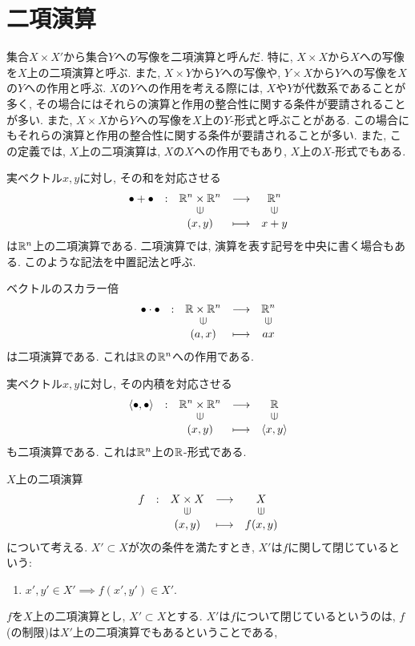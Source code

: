 \section{二項演算}
集合$X\times X'$から集合$Y$への写像を二項演算と呼んだ.
特に, $X\times X$から$X$への写像を$X$上の二項演算と呼ぶ.
また, $X\times Y$から$Y$への写像や,
 $Y\times X$から$Y$への写像を$X$の$Y$への作用と呼ぶ.
$X$の$Y$への作用を考える際には,
$X$や$Y$が代数系であることが多く,
その場合にはそれらの演算と作用の整合性に関する条件が要請されることが多い.
また, $X\times X$から$Y$への写像を$X$上の$Y$-形式と呼ぶことがある.
この場合にもそれらの演算と作用の整合性に関する条件が要請されることが多い.
また, この定義では, $X$上の二項演算は, $X$の$X$への作用でもあり,
$X$上の$X$-形式でもある.

\begin{example}
  実ベクトル$x,y$に対し, その和を対応させる
  \begin{align*}
    \shazo{\bullet+\bullet}
          {\RR^n\times \RR^n}{\RR^n}
          {(x,y)}{x+y}
  \end{align*}
  は$\mathbb{R}^n$上の二項演算である.
  二項演算では, 演算を表す記号を中央に書く場合もある.
  このような記法を中置記法と呼ぶ.
\end{example}

\begin{example}
 ベクトルのスカラー倍
  \begin{align*}
    \shazo{\bullet \cdot \bullet}
          {\RR\times \RR^n}{\RR^n}
          {(a,x)}{ax}
  \end{align*}
  は二項演算である.
  これは$\mathbb{R}$の$\mathbb{R}^n$への作用である.
\end{example}

\begin{example}
  実ベクトル$x,y$に対し, その内積を対応させる
  \begin{align*}
    \shazo{\Braket{\bullet,\bullet}}
          {\RR^n\times \RR^n}{\RR}
          {(x,y)}{\Braket{x,y}}
  \end{align*}
  も二項演算である.
  これは$\mathbb{R}^n$上の$\mathbb{R}$-形式である.
\end{example}

\begin{definition}
  $X$上の二項演算
  \begin{align*}
    \shazo{f}
          {X\times X}{X}
          {(x,y)}{f(x,y)}
  \end{align*}
  について考える.
  $X'\subset X$が次の条件を満たすとき,
  $X'$は$f$に関して閉じているという:
  \begin{enumerate}
  \item $x',y'\in X'\implies f(x',y')\in X'$.
  \end{enumerate}
\end{definition}
\begin{remark}
  $f$を$X$上の二項演算とし,
  $X'\subset X$とする.
  $X'$は$f$について閉じているというのは,
  $f$(の制限)は$X'$上の二項演算でもあるということである,
\end{remark}



